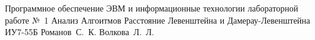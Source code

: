 \documentclass{bmstu}
\begin{document}
{Программное обеспечение ЭВМ и информационные технологии}
{лабораторной работе №~1}
{Анализ Алгоитмов}
{Расстояние Левенштейна и Дамерау-Левенштейна}
{}
{ИУ7-55Б}
{Романов~С.~К.}
{Волкова~Л.~Л.}

\tableofcontents









%

\makebibliography
\end{document}
